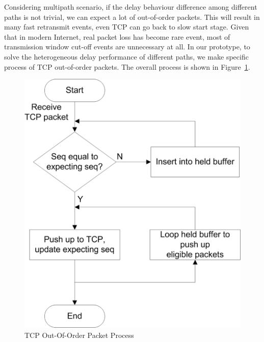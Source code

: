 
Considering multipath scenario, if the delay behaviour difference among different paths is not trivial, we can expect a lot of out-of-order packets. This will result in many fast retransmit events, even TCP can go back to slow start stage. Given that in modern Internet, real packet loss has become rare event, most of transmission window cut-off events are unnecessary at all. In our prototype, to solve the heterogeneous delay performance of different paths, we make specific process of TCP out-of-order packets. The overall process is shown in Figure~\ref{fig.outoforder}.

\begin{figure}
\centering
\includegraphics[width=0.8\linewidth]{fig/outoforder.eps}
\caption{TCP Out-Of-Order Packet Process}
\label{fig.outoforder}
\end{figure}



